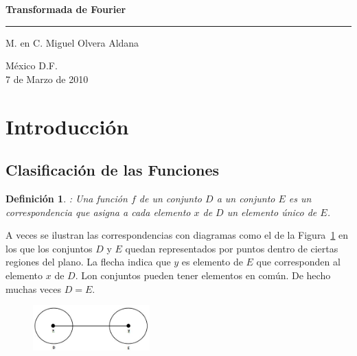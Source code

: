\documentclass[a4paper]{article}
\newtheorem {dfn}{Definici\'on}
\begin{document}
\tableofcontents
\listoffigures

\begin{titlepage}
    \centering 

    \LARGE \textbf{Transformada de Fourier\\}
    	\rule{8.5cm}{2pt} \vspace{0.5cm}

    M. en C. Miguel Olvera Aldana\\

    \vspace{2cm} 

    M\'exico D.F.\\
    7 de Marzo de 2010
 \end{titlepage}

\section{Introducci\'on}

\subsection{Clasificaci\'on de las Funciones}

\begin{dfn}
: Una funci\'on $f$ de un conjunto $D$ a un conjunto $E$ es un
correspondencia que asigna a cada elemento $x$ de $D$ un elemento \'unico de 
$E$. 
\end{dfn}

{} A veces se ilustran las correspondencias con diagramas como el de la
Figura~\ref{fig:correspondencia} en los que los conjuntos $D$ y $E$ quedan
representados por puntos dentro de ciertas regiones del plano. La flecha
indica que $y$ es elemento de $E$ que corresponden al elemento $x$ de $D$.
Lon conjuntos pueden tener elementos en com\'{u}n. De hecho muchas veces $D=E
$. 
\begin{figure}[h]
\centering
\includegraphics[width=0.40\textwidth]{f1p1.jpg}   
\caption{ {}}
\label{fig:correspondencia}
\end{figure}
\end{document}
